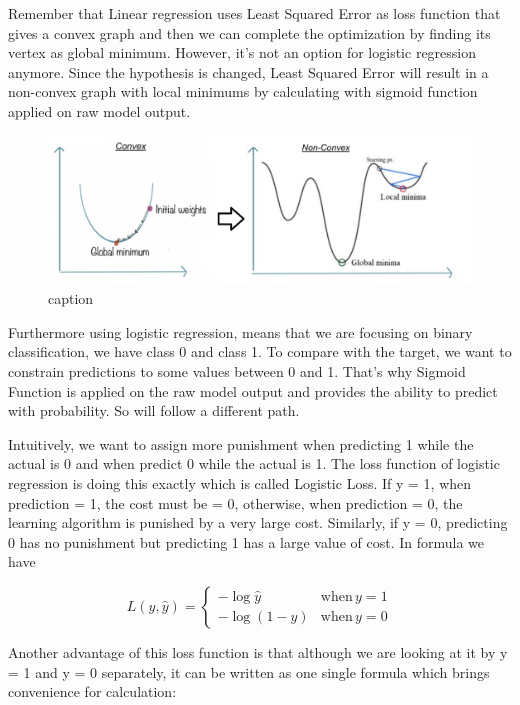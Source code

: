 \documentclass[11pt]{article}
\begin{document}
Remember that Linear regression uses Least Squared Error as loss
function that gives a convex graph and then we can complete the
optimization by finding its vertex as global minimum. However, it's not
an option for logistic regression anymore. Since the hypothesis is
changed, Least Squared Error will result in a non-convex graph with
local minimums by calculating with sigmoid function applied on raw model
output.

    \begin{figure}
\centering
\includegraphics{./pic/chapter-5-1_pic_3.png}
\caption{caption}
\end{figure}

    Furthermore using logistic regression, means that we are focusing on
binary classification, we have class 0 and class 1. To compare with the
target, we want to constrain predictions to some values between 0 and 1.
That's why Sigmoid Function is applied on the raw model output and
provides the ability to predict with probability. So will follow a
different path.

Intuitively, we want to assign more punishment when predicting 1 while
the actual is 0 and when predict 0 while the actual is 1. The loss
function of logistic regression is doing this exactly which is called
Logistic Loss. If y = 1, when prediction = 1, the cost must be = 0,
otherwise, when prediction = 0, the learning algorithm is punished by a
very large cost. Similarly, if y = 0, predicting 0 has no punishment but
predicting 1 has a large value of cost. In formula we have

\begin{equation}
L(y, \hat{y}) = 
\begin{cases} 
-\log{\hat{y}} & \text{when}\, y = 1 \\ -\log(1 - \hat{y}) & \text{when}\, y = 0 
\end{cases} 
\end{equation}

Another advantage of this loss function is that although we are looking
at it by y = 1 and y = 0 separately, it can be written as one single
formula which brings convenience for calculation:
\end{document}
